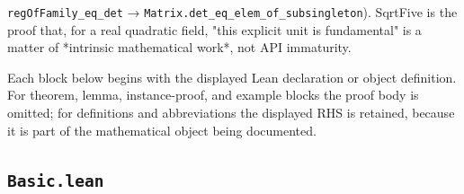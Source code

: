 \documentclass[UTF8,a4paper,11pt,fontset=fandol]{ctexart}
\theoremstyle{definition}
\begin{document}
\texttt{regOfFamily\_\allowbreak{}eq\_\allowbreak{}det} → \texttt{Matrix.\allowbreak{}det\_\allowbreak{}eq\_\allowbreak{}elem\_\allowbreak{}of\_\allowbreak{}subsingleton}). SqrtFive is the proof that, for a real quadratic field, "this explicit unit is fundamental" is a matter of *intrinsic mathematical work*, not API immaturity.

Each block below begins with the displayed Lean declaration or object definition. For theorem, lemma, instance-proof, and example blocks the proof body is omitted; for definitions and abbreviations the displayed RHS is retained, because it is part of the mathematical object being documented.

\subsection{\texttt{Basic.lean}}
\end{document}
